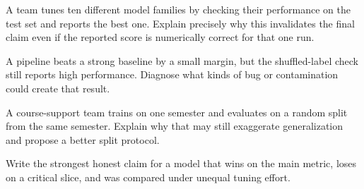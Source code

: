 \begin{challengeexercises}
\item A team tunes ten different model families by checking their performance on the test set and reports the best one. Explain precisely why this invalidates the final claim even if the reported score is numerically correct for that one run.
\item A pipeline beats a strong baseline by a small margin, but the shuffled-label check still reports high performance. Diagnose what kinds of bug or contamination could create that result.
\item A course-support team trains on one semester and evaluates on a random split from the same semester. Explain why that may still exaggerate generalization and propose a better split protocol.
\item Write the strongest honest claim for a model that wins on the main metric, loses on a critical slice, and was compared under unequal tuning effort.
\end{challengeexercises}
